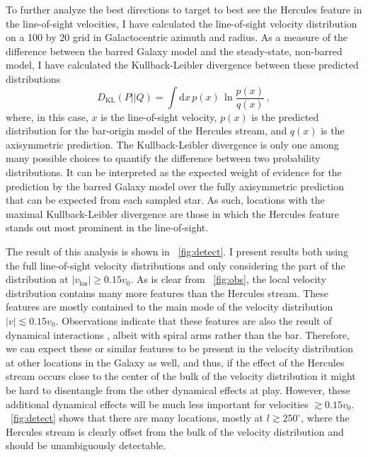 \documentclass[12pt,preprint]{aastex}
\newcommand{\eg}{e.g.}
\newcommand{\dd}{\mathrm{d}}
\newcommand{\vo}{\ensuremath{v_0}}
\begin{document}
To further analyze the best directions to target to best see the
Hercules feature in the line-of-sight velocities, I have calculated
the line-of-sight velocity distribution on a 100 by 20 grid in
Galactocentric azimuth and radius. As a measure of the difference
between the barred Galaxy model and the steady-state, non-barred
model, I have calculated the Kullback-Leibler divergence between these
predicted distributions \citep[\eg,][]{mackay}
\begin{equation}
D_{\text{KL}}(P||Q) = \int \dd x\,p(x)\,\ln \frac{p(x)}{q(x)}\,,
\end{equation}
where, in this case, $x$ is the line-of-sight velocity, $p(x)$ is the
predicted distribution for the bar-origin model of the Hercules
stream, and $q(x)$ is the axisymmetric prediction. The
Kullback-Leibler divergence is only one among many possible choices to
quantify the difference between two probability distributions. It can
be interpreted as the expected weight of evidence for the prediction
by the barred Galaxy model over the fully axisymmetric prediction that
can be expected from each sampled star. As such, locations with the
maximal Kullback-Leibler divergence are those in which the Hercules
feature stands out most prominent in the line-of-sight.

The result of this analysis is shown in
\figurename~\ref{fig:detect}. I present results both using the full
line-of-sight velocity distributions and only considering the part of
the distribution at $|v_{\text{los}}| \geq 0.15 \vo$. As is clear from
\figurename~\ref{fig:obs}, the local velocity distribution contains
many more features than the Hercules stream. These features are mostly
contained to the main mode of the velocity distribution $|v| \lesssim
0.15 \vo$. Observations indicate that these features are also the
result of dynamical interactions \citep[\eg,][]{Bovy10a,sellwood10a},
albeit with spiral arms rather than the bar. Therefore, we can expect
these or similar features to be present in the velocity distribution
at other locations in the Galaxy as well, and thus, if the effect of
the Hercules stream occurs close to the center of the bulk of the
velocity distribution it might be hard to disentangle from the other
dynamical effects at play. However, these additional dynamical effects
will be much less important for velocities $\gtrsim 0.15
\vo$. \figurename~\ref{fig:detect} shows that there are many
locations, mostly at $l \gtrsim 250^{\circ}$, where the Hercules
stream is clearly offset from the bulk of the velocity distribution
and should be unambiguously detectable.
\end{document}
